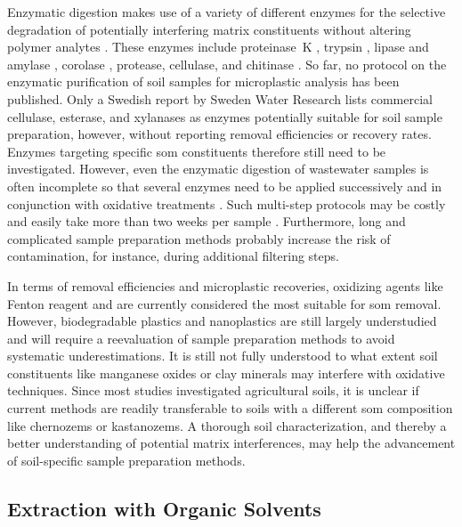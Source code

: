 Enzymatic digestion makes use of a variety of different enzymes for the selective degradation of potentially interfering matrix constituents without altering polymer analytes \citep{LiuAnalytical2020}. These enzymes include proteinase~K \citep{ColeIsolation2014}, trypsin \citep{Courtene-JonesOptimisation2017},
lipase and amylase \citep{RailoApplication2018}, corolase \citep{LaversDetection2019},
protease, cellulase, and chitinase \citep{LoderEnzymatic2017}. So far, no protocol on the enzymatic purification of soil samples for microplastic analysis has been published. Only a Swedish report by Sweden Water Research \citep{LjungMicroplastics2018} lists commercial cellulase, esterase,
and xylanases as enzymes potentially suitable for soil sample preparation,
however, without reporting removal efficiencies or recovery rates.
Enzymes targeting specific \ac{som} constituents therefore still need to be investigated. However, even the enzymatic digestion of wastewater samples is often incomplete so that several enzymes need to be applied successively and in conjunction with oxidative treatments \citep{LoderEnzymatic2017,MintenigIdentification2017}. Such multi-step protocols may be costly and easily take more than two weeks per sample \citep{LoderEnzymatic2017}.
Furthermore, long and complicated sample preparation methods probably increase the risk of contamination, for instance, during additional filtering steps.

In terms of removal efficiencies and microplastic recoveries, oxidizing agents like Fenton reagent and 
are currently considered the most suitable for \ac{som} removal. However,
biodegradable plastics and nanoplastics are still largely understudied and will require a reevaluation of sample preparation methods to avoid systematic underestimations. It is still not fully understood to what extent soil constituents like manganese oxides or clay minerals may interfere with oxidative techniques. Since most studies investigated agricultural soils, it is unclear if current methods are readily transferable to soils with a different \ac{som} composition like chernozems or kastanozems. A thorough soil characterization, and thereby a better understanding of potential matrix interferences, may help the advancement of soil-specific sample preparation methods.

\subsection{Extraction with Organic	Solvents}
\label{sec:analytical-techniques:solvent-extraction}

